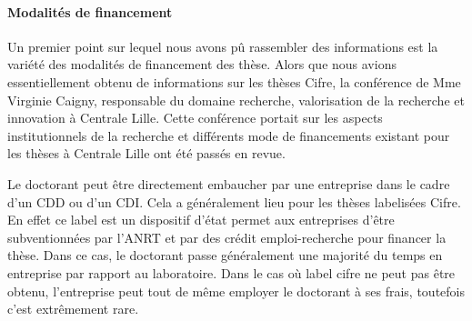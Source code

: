 \documentclass[12pt]{article}
\begin{document}


\paragraph{Modalités de financement}

Un premier point sur lequel nous avons pû rassembler des informations est la variété des modalités de financement des thèse. Alors que nous avions essentiellement obtenu de informations sur les thèses Cifre, la conférence de Mme Virginie Caigny, responsable du domaine recherche, valorisation de la recherche et innovation à Centrale Lille. Cette conférence portait sur les aspects institutionnels de la recherche et différents mode de financements existant pour les thèses à Centrale Lille ont été passés en revue.

Le doctorant peut être directement embaucher par une entreprise dans le cadre d'un CDD ou  d'un CDI. Cela a généralement lieu pour les thèses labelisées Cifre. En effet ce label est un dispositif d'état  permet aux entreprises d'être subventionnées par l'ANRT et par des crédit emploi-recherche pour financer la thèse. Dans ce cas, le doctorant passe généralement une majorité du temps en entreprise par rapport au laboratoire. Dans le cas où label cifre ne peut pas être obtenu, l'entreprise peut tout de même employer le doctorant à ses frais, toutefois c'est extrêmement rare.
\end{document}
